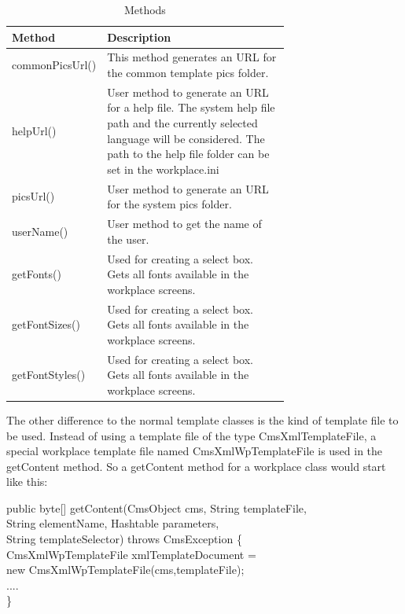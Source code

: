 \begin{table}
\begin{center}
\begin{tabular}{|l|p{0.70\linewidth}|}
\hline
{\bf Method}&
{\bf Description}\\ \hline
commonPicsUrl()&
This method generates an URL for the common template pics folder.\\ \hline
helpUrl()&
User method to generate an URL for a help file. The
system help file path and the currently selected language will be
considered. The path to the help file folder can be set in the
workplace.ini \\ \hline
picsUrl()&
User method to generate an URL for the system pics folder. \\ \hline
userName()&
User method to get the name of the user.\\ \hline
getFonts()&
Used for creating a select box. Gets all fonts available in the workplace screens. \\ \hline
getFontSizes()&
Used for creating a select box. Gets all fonts available in the workplace screens. \\ \hline
getFontStyles()&
Used for creating a select box. Gets all fonts available in the workplace screens. \\ \hline
\end{tabular}
\caption[Methods]{Methods}
\label{CmsWPClass}
\end{center} 
\end{table}


The other difference to the normal template classes is the kind of
template file to be used.  Instead of using a template file of the type
CmsXmlTemplateFile, a special workplace template file named
CmsXmlWpTemplateFile is used in the getContent method.  So a getContent
method for a workplace class would start like this:

\begin{java}
public byte[] getContent(CmsObject cms, String templateFile,\\
\jtabd  String elementName, Hashtable parameters,\\
\jtabd  String templateSelector) throws CmsException \{\\
\jtabe 		CmsXmlWpTemplateFile xmlTemplateDocument =\\
\jtabe 		new CmsXmlWpTemplateFile(cms,templateFile);\\
....\\
\}\\
\end{java}

